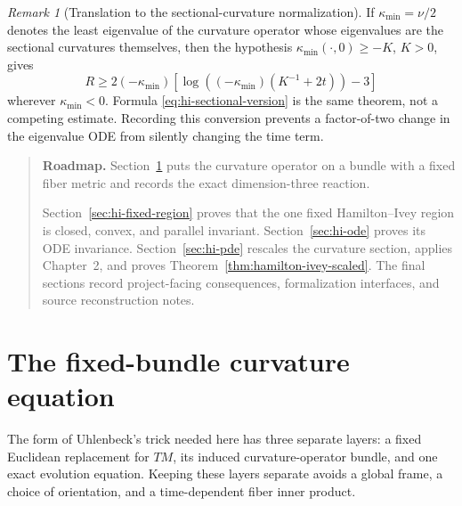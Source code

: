 \documentclass[10pt]{coll-l}
\newenvironment{roadmap}[1]{%
  \begin{quote}\small\noindent\textbf{Roadmap.} #1\par\medskip\noindent
}{\end{quote}}
\theoremstyle{definition}
\theoremstyle{remark}
\newtheorem{remark}[theorem]{Remark}
\numberwithin{section}{chapter}
\numberwithin{equation}{chapter}
\begin{document}
\begin{remark}[Translation to the sectional-curvature normalization]
\label{rem:hi-sectional-normalization}
If $\kappa_{\min}=\nu/2$ denotes the least eigenvalue of the curvature
operator whose eigenvalues are the sectional curvatures themselves, then
the hypothesis $\kappa_{\min}(\cdot,0)\geq-K$, $K>0$, gives
\begin{equation}
 R\geq2(-\kappa_{\min})
 \left[
   \log\!\left((-\kappa_{\min})(K^{-1}+2t)\right)-3
 \right]                                                 \label{eq:hi-sectional-version}
\end{equation}
wherever $\kappa_{\min}<0$.  Formula
\eqref{eq:hi-sectional-version} is the same theorem, not a competing
estimate.  Recording this conversion prevents a factor-of-two change in
the eigenvalue ODE from silently changing the time term.
\end{remark}

\begin{roadmap}{Section~\ref{sec:hi-uhlenbeck} puts the curvature operator
on a bundle with a fixed fiber metric and records the exact
dimension-three reaction.}
Section~\ref{sec:hi-fixed-region} proves that the one fixed
Hamilton--Ivey region is closed, convex, and parallel invariant.
Section~\ref{sec:hi-ode} proves its ODE invariance.  Section~\ref{sec:hi-pde}
rescales the curvature section, applies Chapter~2, and proves
Theorem~\ref{thm:hamilton-ivey-scaled}.  The final sections record
project-facing consequences, formalization interfaces, and source
reconstruction notes.
\end{roadmap}

\section{The fixed-bundle curvature equation}
\label{sec:hi-uhlenbeck}

The form of Uhlenbeck's trick needed here has three separate layers:
a fixed Euclidean replacement for $TM$, its induced curvature-operator
bundle, and one exact evolution equation.  Keeping these layers separate
avoids a global frame, a choice of orientation, and a time-dependent fiber
inner product.
\end{document}
